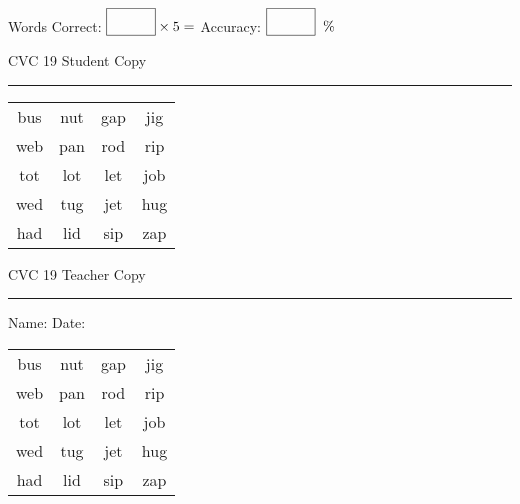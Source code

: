 \documentclass{memoir}
\begin{document}
\normalsize

Words Correct: $\fbox{\phantom{\huge 100}} \times 5 = $ Accuracy: $\fbox{\phantom{\huge 100}}\;\; \%$ 

\vfill

\newpage


\footnotesize \noindent
CVC 19 \hfill Student Copy
\smallskip
\hrule

\huge

\setlength{\tabcolsep}{14pt}
\def\arraystretch{2}

{\selectfont


\begin{vplace}[0.5]
\begin{center}
\begin{tabular}{cccc}
bus & nut & gap & jig \\
web & pan & rod & rip \\
tot & lot & let & job \\
wed & tug & jet & hug \\
had & lid & sip & zap \\
\end{tabular}
\end{center}
\end{vplace}

}

\newpage

\footnotesize \noindent
CVC 19 \hfill Teacher Copy
\smallskip
\hrule

\normalsize

\vfill

\noindent
Name: \underline{\hspace{1.75in}} \hfill Date: \underline{\hspace{1in}}

\huge

{\selectfont


\begin{vplace}[0.5]
\begin{center}
\begin{tabular}{cccc}
bus & nut & gap & jig \\
web & pan & rod & rip \\
tot & lot & let & job \\
wed & tug & jet & hug \\
had & lid & sip & zap \\
\end{tabular}
\end{center}
\end{vplace}



}
\end{document}
